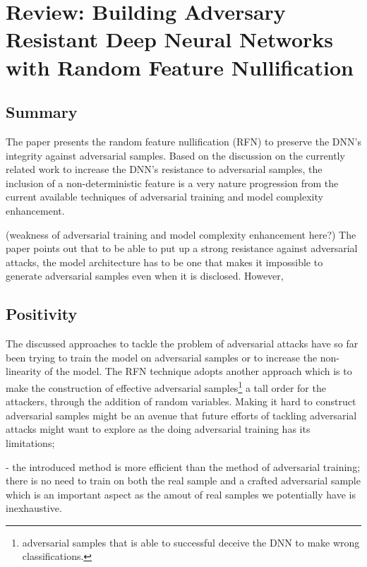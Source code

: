 \documentclass[a4paper,10pt]{article}
\theoremstyle{definition}
\begin{document}
\section*{Review: Building Adversary Resistant Deep Neural Networks with Random Feature Nullification}
\subsection*{Summary}
The paper presents the random feature nullification (RFN) to preserve the DNN's integrity against adversarial samples. Based on the discussion on the currently related work to increase the DNN's resistance to adversarial samples, the inclusion of a non-deterministic feature is a very nature progression from the current available techniques of adversarial training and model complexity enhancement. 

(weakness of adversarial training and model complexity enhancement here?) The paper points out that to be able to put up a strong resistance against adversarial attacks, the model architecture has to be one that makes it impossible to generate adversarial samples even when it is disclosed. However, \cite{goodfellow2014explaining} 





\subsection*{Positivity}
The discussed approaches to tackle the problem of adversarial attacks have so far been trying to train the model on adversarial samples or to increase the non-linearity of the model. The RFN technique adopts another approach which is to make the construction of effective adversarial samples\footnote{adversarial samples that is able to successful deceive the DNN to make wrong classifications.} a tall order for the attackers, through the addition of random variables. Making it hard to construct adversarial samples might be an avenue that future efforts of tackling adversarial attacks might want to explore as the doing adversarial training has its limitations; 




- the introduced method is more efficient than the method of adversarial training; there is no need to train on both the real sample and a crafted adversarial sample which is an important aspect as the amout of real samples we potentially have is inexhaustive.
\end{document}
